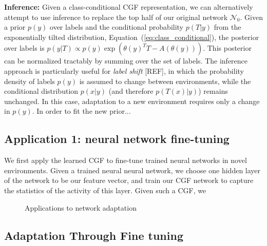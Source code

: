 \documentclass[11pt]{article}      %
\begin{document}
\noindent \textbf{Inference:}
Given a class-conditional CGF representation, we can alternatively attempt to use inference to replace the top half of our original network $\mathcal{N}_0$.
Given a prior $p(y)$ over labels and the conditional probability $p(T|y)$ from the exponentially tilted distribution, Equation~(\ref{eq:class_conditional}), the posterior over labels is $p{(y|T) \propto p(y) \exp(\theta(y)^T T - A(\theta(y)))}$.
This posterior can be normalized tractably by summing over the set of labels.
The inference approach is particularly useful for \textit{label shift} [REF], in which the probability density of labels $p(y)$ is assumed to change between environments, while the conditional distribution $p(x|y)$ (and therefore $p(T(x)|y)$) remains unchanged.
In this case, adaptation to a new environment requires only a change in $p(y)$.
In order to fit the new prior...






\newpage
\subsection{Application 1: neural network fine-tuning}

We first apply the learned CGF to fine-tune trained neural networks in novel environments.
Given a trained neural neural network, we choose one hidden layer of the network to be our feature vector, and train our CGF network to capture the statistics of the activity of this layer.
Given such a CGF, we







\begin{figure}[tb]
  \centering
  \begin{subfigure}[t]{\textwidth}
    \centering
    \caption{}
    \label{fig:3a_adaptation_example}
  \end{subfigure}

  \caption{Applications to network adaptation }
  \label{fig:3_adaptation_example}
\end{figure}




\newpage
\subsection{Adaptation Through Fine tuning}
\end{document}
